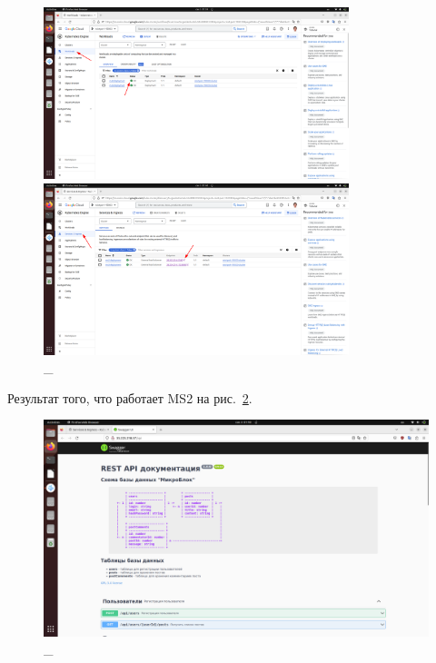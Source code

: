 \documentclass[12pt, a4paper, simple]{eskdtext}
\begin{document}
  \begin{figure}[!h]
    \centering

    \begin{minipage}{0.49\textwidth}
      \centering

      \includegraphics[height=5cm]
      {images/2023-03-03_01-40-02.png}

      \caption{\_}

      \label{fig:8}
    \end{minipage}
    \begin{minipage}{0.49\textwidth}
      \centering

      \includegraphics[height=5cm]
      {images/2023-03-03_01-40-21.png}

      \caption{\_}

      \label{fig:9}
    \end{minipage}
  \end{figure}

  Результат того, что работает MS2 на рис.~\ref{fig:10}.

  \begin{figure}[!h]
    \centering
    \includegraphics[width=18cm]
    {images/2023-03-03_01-40-52.png}
    \caption{\_}
    \label{fig:10}
  \end{figure}
\end{document}

